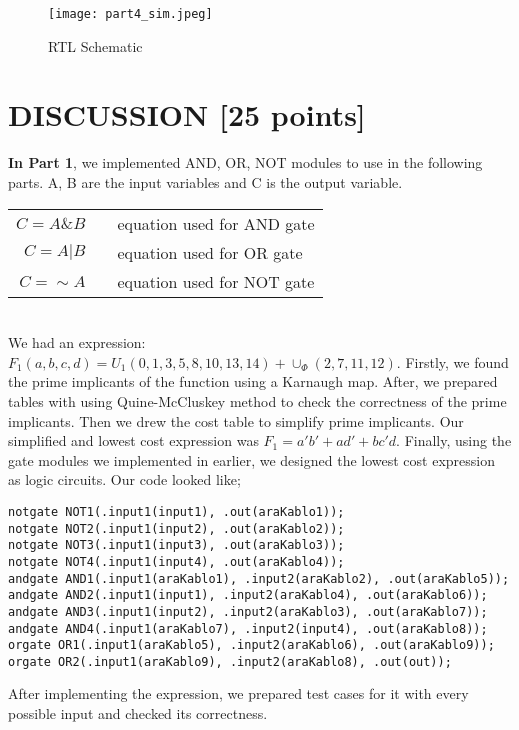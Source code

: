 \documentclass[pdftex,12pt,a4paper]{article}
\begin{document}
\begin{figure}[ht]
	\centering
	\texttt{[image: part4\_sim.jpeg]}	
	\caption{RTL Schematic}
	\label{fig15}
\end{figure}

\section{DISCUSSION [25 points]}
\textbf{In Part 1}, we implemented AND, OR, NOT modules to use in the following parts. A, B are the input variables and C is the output variable. \\

\begin{tabular}{rcl}
\(C = A \& B\) & & equation used for AND gate\\
\(C = A | B\)  & & equation used for OR gate\\
\(C = \sim A\) & & equation used for NOT gate\\
\end{tabular}\\

We had an expression: \(F_1(a, b, c, d) = U_1(0, 1, 3, 5, 8, 10, 13, 14) + \cup_\Phi(2, 7, 11, 12)\). Firstly, we found the prime implicants of the function using a Karnaugh map. After, we prepared tables with using Quine-McCluskey method to check the correctness of the prime implicants. Then we drew the cost table to simplify prime implicants. Our simplified and lowest cost expression was \(F_1 = a'b' + ad' + bc'd\). Finally, using the gate modules we implemented in earlier, we designed the lowest cost expression as logic circuits. Our code looked like;

\begin{verbatim}
notgate NOT1(.input1(input1), .out(araKablo1)); 
notgate NOT2(.input1(input2), .out(araKablo2)); 
notgate NOT3(.input1(input3), .out(araKablo3)); 
notgate NOT4(.input1(input4), .out(araKablo4)); 
andgate AND1(.input1(araKablo1), .input2(araKablo2), .out(araKablo5));
andgate AND2(.input1(input1), .input2(araKablo4), .out(araKablo6));
andgate AND3(.input1(input2), .input2(araKablo3), .out(araKablo7));
andgate AND4(.input1(araKablo7), .input2(input4), .out(araKablo8));
orgate OR1(.input1(araKablo5), .input2(araKablo6), .out(araKablo9));
orgate OR2(.input1(araKablo9), .input2(araKablo8), .out(out));
\end{verbatim}

After implementing the expression, we prepared test cases for it with every possible input and checked its correctness.\\
\end{document}
